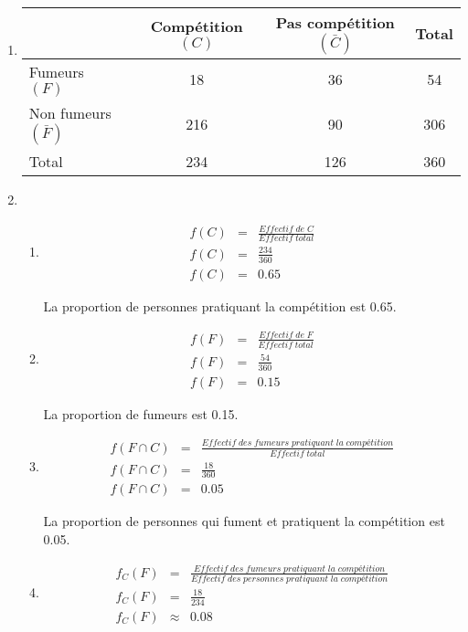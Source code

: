 \documentclass[12pt,a4paper]{article}
\begin{document}
\begin{enumerate}[label=\arabic*)]
	\item \begin{tabular}{|@{\ }l@{\ }|@{\ }c@{\ }|@{\ }c@{\ }|@{$\quad$}c@{$\quad$}|}
		\hline
		& Compétition $(C)$ & Pas compétition $(\bar{C})$ & Total \\ \hline
		Fumeurs  $(F)$   & 18 & 36 & 54 \\ \hline
		Non fumeurs $(\bar{F})$ & 216 & 90 & 306 \\ \hline
		Total & 234 & 126 & 360 \\ \hline
	\end{tabular}

	\item \begin{enumerate}[label=\alph*)]
		\item \begin{eqnarray*}
			f(C) &=& \frac{Effectif\; de\; C}{Effectif\; total} \\
			f(C) &=& \frac{234}{360} \\
			f(C) &=& \num{0.65}
		\end{eqnarray*}
	
	La proportion de personnes pratiquant la compétition est \num{0.65}.
	
		\item \begin{eqnarray*}
			f(F) &=& \frac{Effectif\; de\; F}{Effectif\; total} \\
			f(F) &=& \frac{54}{360} \\
			f(F) &=& \num{0.15}
		\end{eqnarray*}
		
		La proportion de fumeurs est \num{0.15}.
		
		\item \begin{eqnarray*}
			f(F \cap C) &=& \frac{Effectif\; des\; fumeurs \; pratiquant\; la\; compétition}{Effectif\; total} \\
			f(F \cap C) &=& \frac{18}{360} \\
			f(F \cap C) &=& \num{0.05}
		\end{eqnarray*}
		
		La proportion de personnes qui fument et pratiquent la compétition est \num{0.05}.
		
		\item \begin{eqnarray*}
			f_C(F) &=& \frac{Effectif\; des\; fumeurs \; pratiquant\; la\; compétition}{Effectif\; des\; personnes\; pratiquant\; la\; compétition} \\
			f_C(F) &=& \frac{18}{234} \\
			f_C(F) &\approx& \num{0.08}
		\end{eqnarray*}
		

\end{enumerate}
\end{enumerate}
\end{document}
